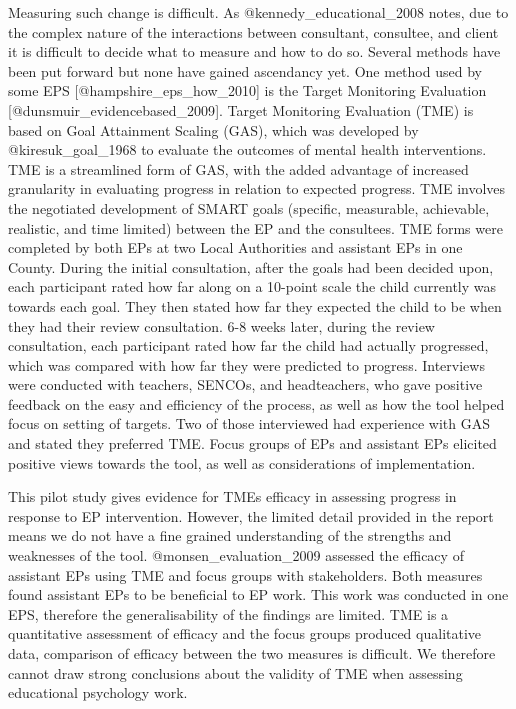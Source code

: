 \documentclass[
]{article}
\begin{document}
Measuring such change is difficult. As @kennedy\_educational\_2008
notes, due to the complex nature of the interactions between consultant,
consultee, and client it is difficult to decide what to measure and how
to do so. Several methods have been put forward but none have gained
ascendancy yet. One method used by some EPS
{[}@hampshire\_eps\_how\_2010{]} is the Target Monitoring Evaluation
{[}@dunsmuir\_evidencebased\_2009{]}. Target Monitoring Evaluation (TME)
is based on Goal Attainment Scaling (GAS), which was developed by
@kiresuk\_goal\_1968 to evaluate the outcomes of mental health
interventions. TME is a streamlined form of GAS, with the added
advantage of increased granularity in evaluating progress in relation to
expected progress. TME involves the negotiated development of SMART
goals (specific, measurable, achievable, realistic, and time limited)
between the EP and the consultees. TME forms were completed by both EPs
at two Local Authorities and assistant EPs in one County. During the
initial consultation, after the goals had been decided upon, each
participant rated how far along on a 10-point scale the child currently
was towards each goal. They then stated how far they expected the child
to be when they had their review consultation. 6-8 weeks later, during
the review consultation, each participant rated how far the child had
actually progressed, which was compared with how far they were predicted
to progress. Interviews were conducted with teachers, SENCOs, and
headteachers, who gave positive feedback on the easy and efficiency of
the process, as well as how the tool helped focus on setting of targets.
Two of those interviewed had experience with GAS and stated they
preferred TME. Focus groups of EPs and assistant EPs elicited positive
views towards the tool, as well as considerations of implementation.

This pilot study gives evidence for TMEs efficacy in assessing progress
in response to EP intervention. However, the limited detail provided in
the report means we do not have a fine grained understanding of the
strengths and weaknesses of the tool. @monsen\_evaluation\_2009 assessed
the efficacy of assistant EPs using TME and focus groups with
stakeholders. Both measures found assistant EPs to be beneficial to EP
work. This work was conducted in one EPS, therefore the generalisability
of the findings are limited. TME is a quantitative assessment of
efficacy and the focus groups produced qualitative data, comparison of
efficacy between the two measures is difficult. We therefore cannot draw
strong conclusions about the validity of TME when assessing educational
psychology work.
\end{document}
